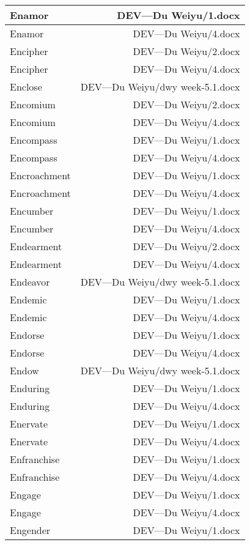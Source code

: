 \documentclass{article}
\begin{document}
\begin{center}
\begin{longtable}{|l|r|}
\hline
Enamor  &  DEV---Du Weiyu/1.docx\\  
\hline
Enamor  &  DEV---Du Weiyu/4.docx\\  
\hline
Encipher  &  DEV---Du Weiyu/2.docx\\  
\hline
Encipher  &  DEV---Du Weiyu/4.docx\\  
\hline
Enclose  &  DEV---Du Weiyu/dwy week-5.1.docx\\  
\hline
Encomium  &  DEV---Du Weiyu/2.docx\\  
\hline
Encomium  &  DEV---Du Weiyu/4.docx\\  
\hline
Encompass  &  DEV---Du Weiyu/1.docx\\  
\hline
Encompass  &  DEV---Du Weiyu/4.docx\\  
\hline
Encroachment  &  DEV---Du Weiyu/1.docx\\  
\hline
Encroachment  &  DEV---Du Weiyu/4.docx\\  
\hline
Encumber  &  DEV---Du Weiyu/1.docx\\  
\hline
Encumber  &  DEV---Du Weiyu/4.docx\\  
\hline
Endearment  &  DEV---Du Weiyu/2.docx\\  
\hline
Endearment  &  DEV---Du Weiyu/4.docx\\  
\hline
Endeavor  &  DEV---Du Weiyu/dwy week-5.1.docx\\  
\hline
Endemic  &  DEV---Du Weiyu/1.docx\\  
\hline
Endemic  &  DEV---Du Weiyu/4.docx\\  
\hline
Endorse  &  DEV---Du Weiyu/1.docx\\  
\hline
Endorse  &  DEV---Du Weiyu/4.docx\\  
\hline
Endow  &  DEV---Du Weiyu/dwy week-5.1.docx\\  
\hline
Enduring  &  DEV---Du Weiyu/1.docx\\  
\hline
Enduring  &  DEV---Du Weiyu/4.docx\\  
\hline
Enervate  &  DEV---Du Weiyu/1.docx\\  
\hline
Enervate  &  DEV---Du Weiyu/4.docx\\  
\hline
Enfranchise  &  DEV---Du Weiyu/1.docx\\  
\hline
Enfranchise  &  DEV---Du Weiyu/4.docx\\  
\hline
Engage  &  DEV---Du Weiyu/1.docx\\  
\hline
Engage  &  DEV---Du Weiyu/4.docx\\  
\hline
Engender  &  DEV---Du Weiyu/1.docx\\  

\end{longtable}
\end{center}
\end{document}
